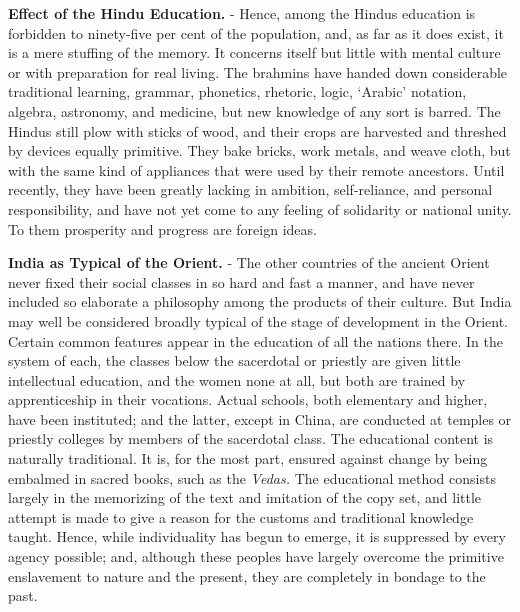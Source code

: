 \documentclass[
]{book}
\begin{document}
\textbf{Effect of the Hindu Education.} - Hence, among the Hindus education is forbidden to ninety-five per cent of the population, and, as far as it does exist, it is a mere stuffing of the memory. It concerns itself but little with mental culture or with preparation for real living. The brahmins have handed down considerable traditional learning, grammar, phonetics, rhetoric, logic, `Arabic' notation, algebra, astronomy, and medicine, but new knowledge of any sort is barred. The Hindus still plow with sticks of wood, and their crops are harvested and threshed by devices equally primitive. They bake bricks, work metals, and weave cloth, but with the same kind of appliances that were used by their remote ancestors. Until recently, they have been greatly lacking in ambition, self-reliance, and personal responsibility, and have not yet come to any feeling of solidarity or national unity. To them prosperity and progress are foreign ideas.

\textbf{India as Typical of the Orient.} - The other countries of the ancient Orient never fixed their social classes in so hard and fast a manner, and have never included so elaborate a philosophy among the products of their culture. But India may well be considered broadly typical of the stage of development in the Orient. Certain common features appear in the education of all the nations there. In the system of each, the classes below the sacerdotal or priestly are given little intellectual education, and the women none at all, but both are trained by apprenticeship in their vocations. Actual schools, both elementary and higher, have been instituted; and the latter, except in China, are conducted at temples or priestly colleges by members of the sacerdotal class. The educational content is naturally traditional. It is, for the most part, ensured against change by being embalmed in sacred books, such as the \emph{Vedas.} The educational method consists largely in the memorizing of the text and imitation of the copy set, and little attempt is made to give a reason for the customs and traditional knowledge taught. Hence, while individuality has begun to emerge, it is suppressed by every agency possible; and, although these peoples have largely overcome the primitive enslavement to nature and the present, they are completely in bondage to the past.
\end{document}
